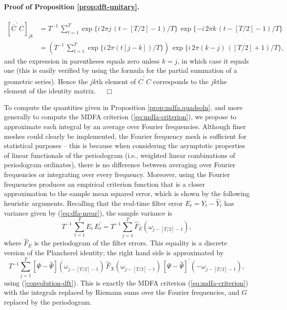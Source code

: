 \documentclass[a4paper]{book}
\begin{document}
\paragraph{Proof of Proposition \ref{prop:dft-unitary}.}
\begin{align*}
  {\left[ \overline{C}^{\prime} \, C \right] }_{jk} & =
 T^{-1} \, \sum_{t=1}^T \exp \{ i  \, 2 \pi j \, (t-[T/2]-1)/T \} \,
	\exp  \{ - i \, 2 \pi k \, (t - [T/2]-1)/T \} \\
	& = \left( T^{-1} \, \sum_{t=1}^T \exp \{ i \, 2 \pi (t [j-k]) /T \} \right) \,
	\exp \{ i \, 2 \pi (k-j) \, ([T/2]+1)/T \},
\end{align*}
 and the expression in parentheses equals zero unless $k=j$, in which case it equals
 one (this is easily verified by using the formula for the partial summation of a
 geometric series).  Hence  the $jk$th element of $\overline{C}^{\prime} \, C$ 
 corresponds to the $jk$the element of the identity matrix.  $\quad \Box$

\vspace{.5cm}

To compute the quantities given in Proposition \ref{prop:mdfa.quadsoln}, and more
 generally to compute the MDFA criterion (\ref{eq:mdfa-criterion}), we propose 
 to approximate each integral by an average over Fourier frequencies.  
 Although finer meshes could clearly be implemented, the Fourier frequency mesh
 is sufficient for statistical purposes -- this is because when considering
 the asymptotic properties of linear functionals of the periodogram (i.e.,
 weighted linear combinations of periodogram ordinates), there is no difference
 between averaging over Fourier frequencies or integrating over every frequency.
 Moreover, using the Fourier frequencies produces an empirical criterion function
 that is a closer approximation to the sample mean squared error, which is shown
 by the following heuristic arguments.  Recalling that the real-time filter error
 $E_t = Y_t - \widehat{Y}_t$ has variance given by (\ref{eq:dfa-mvar}), the sample 
 variance is
\[
  T^{-1} \, \sum_{t=1}^T E_t \, E_t^{\prime} = T^{-1} \sum_{j=1}^T \widehat{F}_E (\omega_{j-[T/2]-1}),
\]
 where $\widehat{F}_E$ is the periodogram of the filter errors.  This equality
 is a discrete version of the Plancherel identity; the right hand side is approximated
 by 
\[
 T^{-1} \sum_{j=1}^T \left[ \Psi - \widehat{\Psi} \right](\omega_{j-[T/2]-1}) \,
   \widehat{F}_X (\omega_{j-[T/2]-1}) \,
 {\left[ \Psi - \widehat{\Psi} \right]}^{\prime} (-\omega_{j-[T/2]-1}),
\]
  using (\ref{convolution-dft}).  This is exactly the MDFA criterion
 (\ref{eq:mdfa-criterion}) with the integrals replaced by Riemann
 sums over the Fourier frequencies, and $G$ replaced by the periodogram.
\end{document}
